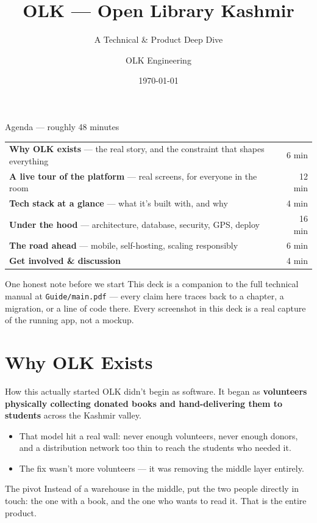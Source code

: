 \documentclass[aspectratio=169,11pt]{beamer}
\title{OLK --- Open Library Kashmir}
\subtitle{A Technical \& Product Deep Dive}
\author{OLK Engineering}
\date{\today}
\newcommand{\code}[1]{\textcolor{olkTealDark}{\texttt{#1}}}
\begin{document}
\begin{frame}
  \titlepage
\end{frame}

\begin{frame}{Agenda --- roughly 48 minutes}
  \small
  \begin{tabular}{@{}p{8cm}r@{}}
    \textbf{Why OLK exists} --- the real story, and the constraint that shapes everything & 6 min \\[2pt]
    \textbf{A live tour of the platform} --- real screens, for everyone in the room & 12 min \\[2pt]
    \textbf{Tech stack at a glance} --- what it's built with, and why & 4 min \\[2pt]
    \textbf{Under the hood} --- architecture, database, security, GPS, deploy & 16 min \\[2pt]
    \textbf{The road ahead} --- mobile, self-hosting, scaling responsibly & 6 min \\[2pt]
    \textbf{Get involved \& discussion} & 4 min \\
  \end{tabular}
  \vspace{8pt}
  \begin{alertblock}{One honest note before we start}
    \small This deck is a companion to the full technical manual at \code{Guide/main.pdf} --- every claim here traces back to a chapter, a migration, or a line of code there. Every screenshot in this deck is a real capture of the running app, not a mockup.
  \end{alertblock}
\end{frame}

\section{Why OLK Exists}

\begin{frame}{How this actually started}
  OLK didn't begin as software. It began as \textbf{volunteers physically collecting donated books and hand-delivering them to students} across the Kashmir valley.
  \vspace{4pt}
  \begin{itemize}
    \item That model hit a real wall: never enough volunteers, never enough donors, and a distribution network too thin to reach the students who needed it.
    \item The fix wasn't more volunteers --- it was removing the middle layer entirely.
  \end{itemize}
  \vfill
  \begin{block}{The pivot}
    Instead of a warehouse in the middle, put the two people directly in touch: the one with a book, and the one who wants to read it. That is the entire product.
  \end{block}
\end{frame}
\end{document}
